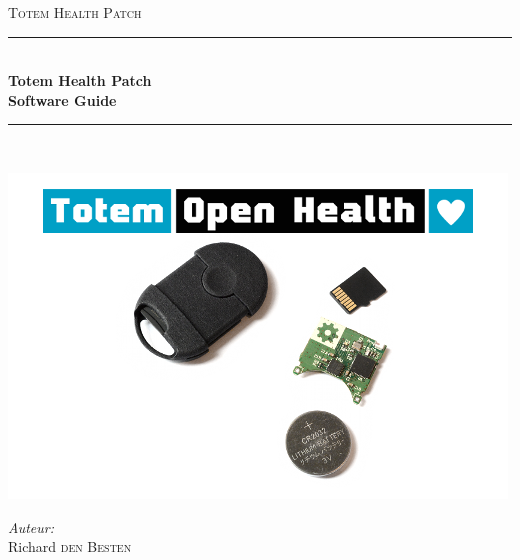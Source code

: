 \documentclass[12pt,a4paper]{report}
\begin{document}
\begin{titlepage}

\newcommand{\HRule}{\rule{\linewidth}{0.5mm}} %

\center %
 

\textsc{\LARGE Totem Health Patch}\\[1.5cm] %


\HRule \\[0.4cm]
{ \huge \bfseries Totem Health Patch\\Software Guide}\\[0.4cm] %
\HRule \\[1.5cm]

\begin{center}
	\includegraphics[scale=4.0]{totem}
\end{center} 

\begin{minipage}{0.4\textwidth}
\begin{flushleft} \large
\emph{Auteur:}\\
Richard \textsc{den Besten}%
\end{flushleft}
\end{minipage}
~
\begin{minipage}{0.4\textwidth}
\begin{flushright} \large 
\emph{} 
\textsc{} %
\end{flushright}
\end{minipage}\\[4cm]


\end{titlepage}
\end{document}
